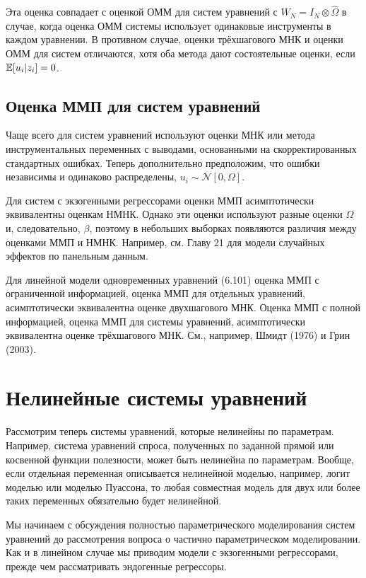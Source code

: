 Эта оценка совпадает с оценкой ОММ для систем уравнений с $W_N= I_N \otimes \hat{\Omega}$ в случае, когда оценка ОММ системы использует одинаковые инструменты в каждом уравнении. В противном случае, оценки трёхшагового МНК и оценки ОММ для систем отличаются, хотя оба метода дают состоятельные оценки, если $\mathbb{E}[u_i|z_i]=0$.

\subsection{Оценка ММП для систем уравнений}

Чаще всего для систем уравнений используют оценки МНК или метода инструментальных переменных с выводами, основанными на скорректированных стандартных ошибках. Теперь дополнительно предположим, что ошибки независимы и одинаково распределены, $u_i \sim \mathcal{N}[0,\Omega]$.

Для систем с экзогенными регрессорами оценки ММП асимптотически эквивалентны оценкам НМНК. Однако эти оценки используют разные оценки $\Omega$ и, следовательно, $\beta$, поэтому в небольших выборках появляются различия между оценками ММП и НМНК. Например, см. Главу 21 для модели случайных эффектов по панельным данным.

Для линейной модели одновременных уравнений (6.101) оценка ММП с ограниченной информацией, оценка ММП для отдельных уравнений, асимптотически эквивалентна оценке двухшагового МНК. Оценка ММП с полной информацией, оценка ММП для системы уравнений, асимптотически эквивалентна оценке трёхшагового МНК. См., например, Шмидт (1976) и Грин (2003).

\section{Нелинейные системы уравнений}

Рассмотрим теперь системы уравнений, которые нелинейны по параметрам. Например, система уравнений спроса, полученных по заданной прямой или косвенной функции полезности, может быть нелинейна по параметрам. Вообще, если отдельная переменная описывается нелинейной моделью, например, логит моделью или моделью Пуассона, то любая совместная модель для двух или более таких переменных обязательно будет нелинейной.

Мы начинаем с обсуждения полностью параметрического моделирования систем уравнений до рассмотрения вопроса о частично параметрическом моделировании. Как и в линейном случае мы приводим модели с экзогенными регрессорами, прежде чем рассматривать эндогенные регрессоры.

